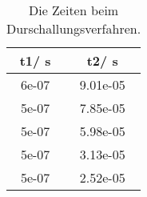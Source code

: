 \begin{table}\caption{Die Zeiten beim Durschallungsverfahren.}
\label{tabc}
\centering
{}
\begin{tabular}{S[]S[]} 
\toprule
{t1/ \si{\second}} & {t2/ \si{\second}}\\
\midrule
6e-07 & 9.01e-05\\
5e-07 & 7.85e-05\\
5e-07 & 5.98e-05\\
5e-07 & 3.13e-05\\
5e-07 & 2.52e-05\\
\bottomrule
\end{tabular}\end{table}